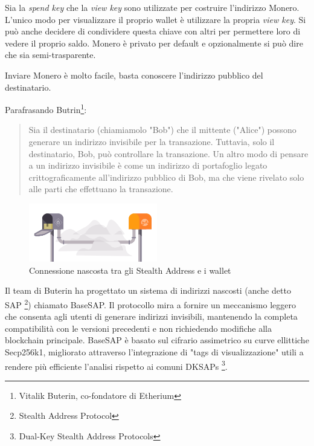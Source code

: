 \documentclass[12pt,a4paper]{article}
\begin{document}
    Sia la \textit{spend key} che la \textit{view key} sono utilizzate per
    costruire l'indirizzo Monero. L'unico modo per visualizzare il proprio
    wallet è utilizzare la propria \textit{view key}. Si può anche decidere di
    condividere questa chiave con altri per permettere loro di vedere il proprio
    saldo. Monero è privato per default e opzionalmente si può dire che sia
    semi-trasparente.

    Inviare Monero è molto facile, basta conoscere l'indirizzo pubblico del
    destinatario.
    
    Parafrasando Butrin\footnote{Vitalik Buterin, co-fondatore di Etherium}:
    \begin{quote}
        Sia il destinatario (chiamiamolo "Bob") che il mittente ("Alice")
        possono generare un indirizzo invisibile per la transazione. Tuttavia,
        solo il destinatario, Bob, può controllare la transazione. Un altro modo
        di pensare a un indirizzo invisibile è come un indirizzo di portafoglio
        legato crittograficamente all’indirizzo pubblico di Bob, ma che viene
        rivelato solo alle parti che effettuano la transazione. \cite{Buterin
        Quote}
    \end{quote}

    \begin{figure}[ht]
        \centering
        \includegraphics[width=0.5\textwidth]{./images/stealth_address.png}
        \caption{Connessione nascosta tra gli Stealth Address e i wallet}
        \label{fig:encription}
    \end{figure}

    Il team di Buterin ha progettato un sistema di indirizzi nascosti (anche
    detto SAP \footnote{Stealth Address Protocol}) chiamato BaseSAP. Il
    protocollo mira a fornire un meccanismo leggero che consenta agli utenti di
    generare indirizzi invisibili, mantenendo la completa compatibilità con le
    versioni precedenti e non richiedendo modifiche alla blockchain principale.
    BaseSAP è basato sul cifrario assimetrico su curve ellittiche Secp256k1,
    migliorato attraverso l'integrazione di "tags di visualizzazione" utili a
    rendere più efficiente l'analisi rispetto ai comuni DKSAPs
    \footnote{Dual-Key Stealth Address Protocols}.
\end{document}
